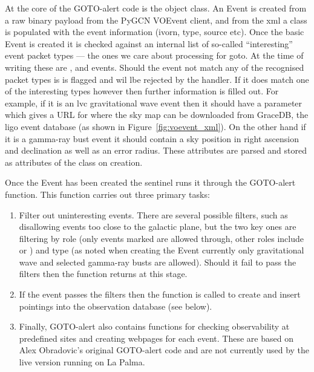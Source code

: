 \begin{colsection}
\begin{colsection}
At the core of the GOTO-alert code is the  object class. An Event is created from a raw binary payload from the PyGCN VOEvent client, and from the \gls{xml} a  class is populated with the event information (\gls{ivorn}, type, source etc). Once the basic Event is created it is checked against an internal list of so-called ``interesting'' event packet types --- the ones we care about processing for \gls{goto}. At the time of writing these are ,  and  events. Should the event not match any of the recognised packet types is is flagged and wil lbe rejected by the handler. If it does match one of the interesting types however then further information is filled out. For example, if it is an \gls{lvc} gravitational wave event then it should have a  parameter which gives a URL for where the sky map can be downloaded from GraceDB, the \gls{ligo} event database (as shown in Figure~\ref{fig:voevent_xml}). On the other hand if it is a gamma-ray bust event it should contain a sky position in right ascension and declination as well as an error radius. These attributes are parsed and stored as attributes of the  class on creation.

Once the Event has been created the sentinel runs it through the GOTO-alert  function. This function carries out three primary tasks:
\begin{enumerate}
    \item Filter out uninteresting events. There are several possible filters, such as disallowing events too close to the galactic plane, but the two key ones are filtering by role (only events marked  are allowed through, other roles include  or ) and type (as noted when creating the Event currently only gravitational wave and selected gamma-ray busts are allowed). Should it fail to pass the filters then the function returns at this stage.
    \item If the event passes the filters then the  function is called to create and insert pointings into the observation database (see below).
    \item Finally, GOTO-alert also contains functions for checking observability at predefined sites and creating webpages for each event. These are based on Alex Obradovic's original GOTO-alert code and are not currently used by the live version running on La Palma.
\end{enumerate}


\end{colsection}
\end{colsection}
